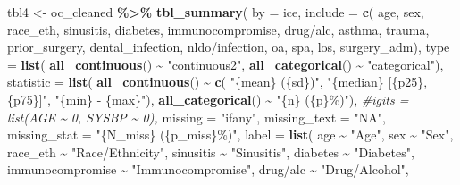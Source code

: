\documentclass[
]{article}
\newenvironment{Shaded}{\begin{snugshade}}{\end{snugshade}}
\newcommand{\AttributeTok}[1]{\textcolor[rgb]{0.13,0.29,0.53}{#1}}
\newcommand{\CommentTok}[1]{\textcolor[rgb]{0.56,0.35,0.01}{\textit{#1}}}
\newcommand{\FunctionTok}[1]{\textcolor[rgb]{0.13,0.29,0.53}{\textbf{#1}}}
\newcommand{\NormalTok}[1]{#1}
\newcommand{\OtherTok}[1]{\textcolor[rgb]{0.56,0.35,0.01}{#1}}
\newcommand{\SpecialCharTok}[1]{\textcolor[rgb]{0.81,0.36,0.00}{\textbf{#1}}}
\newcommand{\StringTok}[1]{\textcolor[rgb]{0.31,0.60,0.02}{#1}}
\begin{document}
\begin{Shaded}
\begin{Highlighting}[]
\NormalTok{tbl4 }\OtherTok{\textless{}{-}}\NormalTok{ oc\_cleaned }\SpecialCharTok{\%\textgreater{}\%}
  \FunctionTok{tbl\_summary}\NormalTok{(}
    \AttributeTok{by =}\NormalTok{ ice,}
    \AttributeTok{include =} \FunctionTok{c}\NormalTok{(}
\NormalTok{      age, sex, race\_eth, sinusitis, diabetes, immunocompromise, }\StringTok{\textasciigrave{}}\AttributeTok{drug/alc}\StringTok{\textasciigrave{}}\NormalTok{,}
\NormalTok{      asthma, trauma, prior\_surgery, dental\_infection, }\StringTok{\textasciigrave{}}\AttributeTok{nldo/infection}\StringTok{\textasciigrave{}}\NormalTok{, }
\NormalTok{      oa, spa, los, surgery\_adm),}
    \AttributeTok{type =} \FunctionTok{list}\NormalTok{(}
      \FunctionTok{all\_continuous}\NormalTok{() }\SpecialCharTok{\textasciitilde{}} \StringTok{"continuous2"}\NormalTok{,}
      \FunctionTok{all\_categorical}\NormalTok{() }\SpecialCharTok{\textasciitilde{}} \StringTok{"categorical"}\NormalTok{),}
    \AttributeTok{statistic =} \FunctionTok{list}\NormalTok{(}
      \FunctionTok{all\_continuous}\NormalTok{() }\SpecialCharTok{\textasciitilde{}} \FunctionTok{c}\NormalTok{(}
        \StringTok{"\{mean\} (\{sd\})"}\NormalTok{,}
        \StringTok{"\{median\} [\{p25\}, \{p75\}]"}\NormalTok{,}
        \StringTok{"\{min\} {-} \{max\}"}\NormalTok{),}
      \FunctionTok{all\_categorical}\NormalTok{() }\SpecialCharTok{\textasciitilde{}} \StringTok{"\{n\} (\{p\}\%)"}\NormalTok{),}
    \CommentTok{\#igits = list(AGE \textasciitilde{} 0, SYSBP \textasciitilde{} 0),}
    \AttributeTok{missing =} \StringTok{"ifany"}\NormalTok{,}
    \AttributeTok{missing\_text =} \StringTok{"NA"}\NormalTok{,}
    \AttributeTok{missing\_stat =} \StringTok{"\{N\_miss\} (\{p\_miss\}\%)"}\NormalTok{,}
    \AttributeTok{label =} \FunctionTok{list}\NormalTok{(}
\NormalTok{      age }\SpecialCharTok{\textasciitilde{}} \StringTok{"Age"}\NormalTok{,}
\NormalTok{      sex }\SpecialCharTok{\textasciitilde{}} \StringTok{"Sex"}\NormalTok{,}
\NormalTok{      race\_eth }\SpecialCharTok{\textasciitilde{}} \StringTok{"Race/Ethnicity"}\NormalTok{,}
\NormalTok{      sinusitis }\SpecialCharTok{\textasciitilde{}} \StringTok{"Sinusitis"}\NormalTok{,}
\NormalTok{      diabetes }\SpecialCharTok{\textasciitilde{}} \StringTok{"Diabetes"}\NormalTok{,}
\NormalTok{      immunocompromise }\SpecialCharTok{\textasciitilde{}} \StringTok{"Immunocompromise"}\NormalTok{,}
      \StringTok{\textasciigrave{}}\AttributeTok{drug/alc}\StringTok{\textasciigrave{}} \SpecialCharTok{\textasciitilde{}} \StringTok{"Drug/Alcohol"}\NormalTok{,}

\end{Highlighting}
\end{Shaded}
\end{document}
